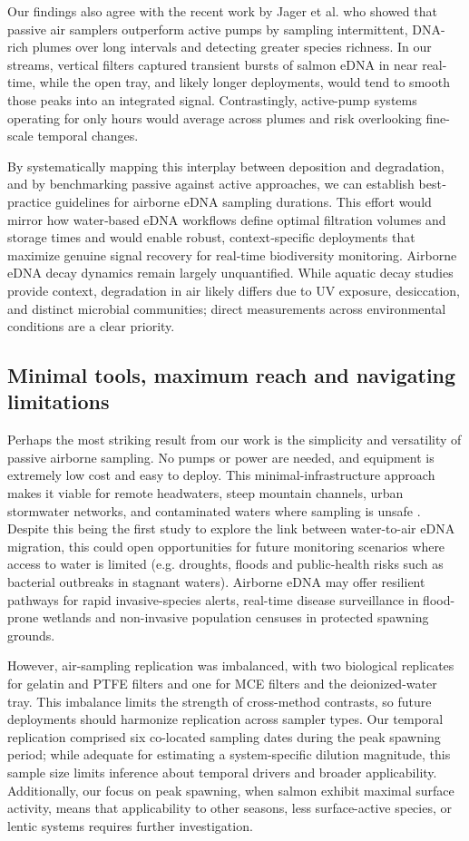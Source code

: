 \documentclass{article}
\begin{document}
Our findings also agree with the recent work by Jager et al. \cite{jager2025} who showed that passive air samplers outperform active pumps by sampling intermittent, DNA-rich plumes over long intervals and detecting greater species richness. In our streams, vertical filters captured transient bursts of salmon eDNA in near real-time, while the open tray, and likely longer deployments, would tend to smooth those peaks into an integrated signal. Contrastingly, active-pump systems operating for only hours would average across plumes and risk overlooking fine-scale temporal changes.

By systematically mapping this interplay between deposition and degradation, and by benchmarking passive against active approaches, we can establish best‐practice guidelines for airborne eDNA sampling durations. This effort would mirror how water‐based eDNA workflows define optimal filtration volumes and storage times \cite{barnes2016, altermatt2025} and would enable robust, context‐specific deployments that maximize genuine signal recovery for real‐time biodiversity monitoring. Airborne eDNA decay dynamics remain largely unquantified. While aquatic decay studies provide context, degradation in air likely differs due to UV exposure, desiccation, and distinct microbial communities; direct measurements across environmental conditions are a clear priority.

\subsection{Minimal tools, maximum reach and navigating limitations}
Perhaps the most striking result from our work is the simplicity and versatility of passive airborne sampling. No pumps or power are needed, and equipment is extremely low cost and easy to deploy. This minimal-infrastructure approach makes it viable for remote headwaters, steep mountain channels, urban stormwater networks, and contaminated waters where sampling is unsafe \cite{harrison2019, bagley2019}. Despite this being the first study to explore the link between water-to-air eDNA migration, this could open opportunities for future monitoring scenarios where access to water is limited (e.g. droughts, floods and public-health risks such as bacterial outbreaks in stagnant waters). Airborne eDNA may offer resilient pathways for rapid invasive-species alerts, real-time disease surveillance in flood-prone wetlands and non-invasive population censuses in protected spawning grounds.

However, air-sampling replication was imbalanced, with two biological replicates for gelatin and PTFE filters and one for MCE filters and the deionized-water tray. This imbalance limits the strength of cross-method contrasts, so future deployments should harmonize replication across sampler types. Our temporal replication comprised six co-located sampling dates during the peak spawning period; while adequate for estimating a system-specific dilution magnitude, this sample size limits inference about temporal drivers and broader applicability. Additionally, our focus on peak spawning,  when salmon exhibit maximal surface activity, means that applicability to other seasons, less surface-active species, or lentic systems requires further investigation.
\end{document}
